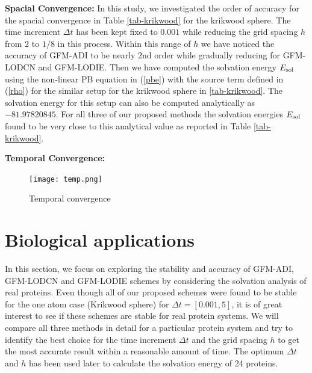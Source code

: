 \textbf{Spacial Convergence:}  In this study, we investigated the order of  accuracy for the spacial convergence in Table \ref{tab-krikwood} for the krikwood sphere. The time increment $\Delta t$ has been kept fixed to $0.001$ while reducing the grid spacing $h$ from $2$ to $1/8$ in this process. Within this range of $h$ we have noticed the accuracy of GFM-ADI to be nearly 2nd order while gradually reducing for GFM-LODCN and GFM-LODIE. Then we have computed the solvation energy $E_{\rm sol}$ using the non-linear PB equation in (\ref{pbe}) with the source term defined in (\ref{rho}) for the similar setup for the krikwood sphere in \ref{tab-krikwood}. The solvation energy for this setup can also be computed analytically as $-81.97820845$. For all three of our proposed methods the solvation energies $E_{\rm sol}$ found to be very close to this analytical value as reported in Table \ref{tab-krikwood}. 

\textbf{Temporal Convergence:}

\begin{figure}[!ht]
	\centering
	\texttt{[image: temp.png]}
	\caption{Temporal convergence}
\end{figure}
   
\section{Biological applications}

In this section, we focus on exploring the stability and accuracy of GFM-ADI, GFM-LODCN and GFM-LODIE schemes by considering the solvation analysis of real proteins. Even though all of our proposed schemes were found to be stable for the one atom case (Krikwood sphere) for $\Delta t =[0.001,5]$, it is of great interest to see if these schemes are stable for real protein systems. We will compare all three methods in detail for a particular protein system and try to identify the best choice for the time increment $\Delta t $ and the grid spacing $h$ to get the most accurate result within a reasonable amount of time. The optimum $\Delta t$ and $h$ has been used later to calculate the solvation energy of 24 proteins.      

